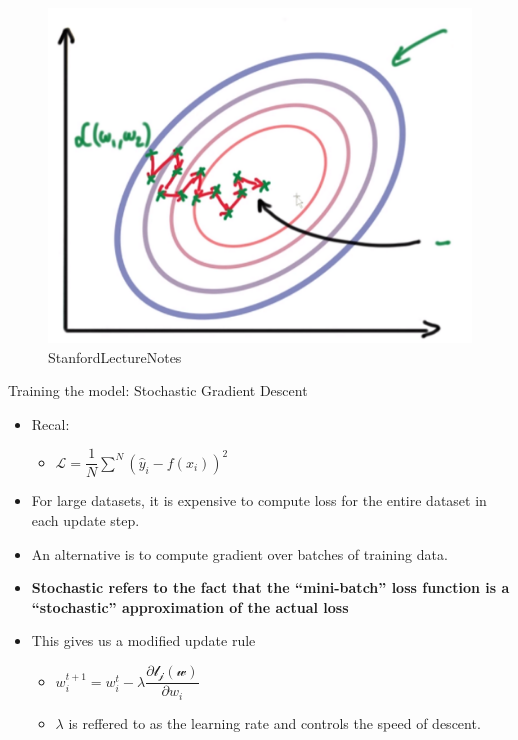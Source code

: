 \documentclass[11pt]{article}
\makeatletter
\def\maxwidth{\ifdim\Gin@nat@width>\linewidth\linewidth
    \else\Gin@nat@width\fi}
\let\Oldincludegraphics\includegraphics
\renewcommand{\includegraphics}[1]{\Oldincludegraphics[width=.8\maxwidth]{#1}}
\providecommand{\tightlist}{%
      \setlength{\itemsep}{0pt}\setlength{\parskip}{0pt}}
\makeatother
\begin{document}
    \begin{figure}
\centering
\includegraphics{pres_imgs/grad_descent.png}
\caption{StanfordLectureNotes}
\end{figure}

    Training the model: Stochastic Gradient Descent

\begin{itemize}
\tightlist
\item
  Recal:

  \begin{itemize}
  \tightlist
  \item
    \(\mathcal{L} = \dfrac{1}{N}\sum^{N}(\hat{y}_i - f(x_i))^{2}\)
  \end{itemize}
\item
  For large datasets, it is expensive to compute loss for the entire
  dataset in each update step.
\item
  An alternative is to compute gradient over batches of training data.
\item
  \textbf{Stochastic refers to the fact that the ``mini-batch'' loss
  function is a ``stochastic'' approximation of the actual loss}
\item
  This gives us a modified update rule

  \begin{itemize}
  \tightlist
  \item
    \(w_{i}^{t+1} = w_{i}^{t} - \lambda \dfrac{\partial \mathcal{l_j(w)}}{\partial{w_i}}\)
  \item
    \(\lambda\) is reffered to as the learning rate and controls the
    speed of descent.
  \end{itemize}
\end{itemize}
\end{document}
